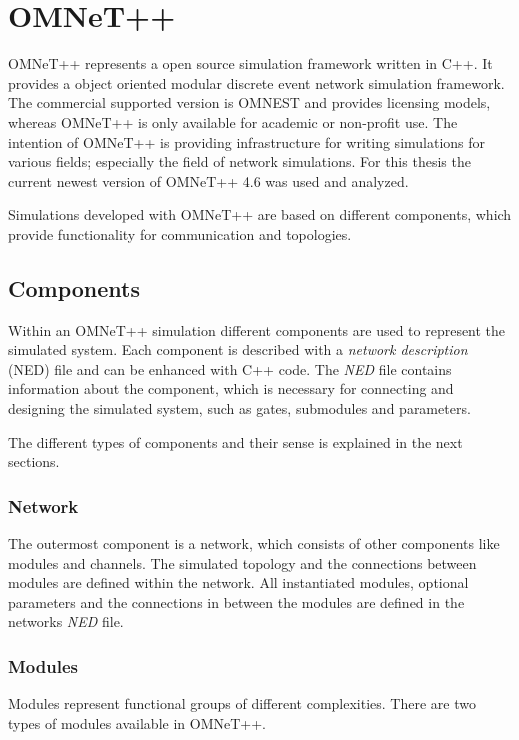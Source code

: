 \chapter{OMNeT++}
\label{cha:omnet}

OMNeT++ represents a open source simulation framework written in C++.
It provides a object oriented modular discrete event network simulation framework.
The commercial supported version is OMNEST and provides licensing models, whereas OMNeT++ is only available for academic or non-profit use.
The intention of OMNeT++ is providing infrastructure for writing simulations for various fields; especially the field of network simulations.
For this thesis the current newest version of OMNeT++ 4.6 was used and analyzed.

Simulations developed with OMNeT++ are based on different components, which provide functionality for communication and topologies.

\section{Components}
\label{sec:omnet_components}
Within an OMNeT++ simulation different components are used to represent the simulated system.
Each component is described with a \emph{network description} (NED) file and can be enhanced with C++ code.
The \emph{NED} file contains information about the component, which is necessary for connecting and designing the simulated system, such as gates, submodules and parameters.

The different types of components and their sense is explained in the next sections.

\subsection{Network}
\label{sec:omnet_components_network}
The outermost component is a network, which consists of other components like modules and channels.
The simulated topology and the connections between modules are defined within the network.
All instantiated modules, optional parameters and the connections in between the modules are defined in the networks \emph{NED} file. \cite[section 3.2.1]{omnet_manual}

\subsection{Modules}
\label{sec:omnet_components_modules}
Modules represent functional groups of different complexities.
There are two types of modules available in OMNeT++.

